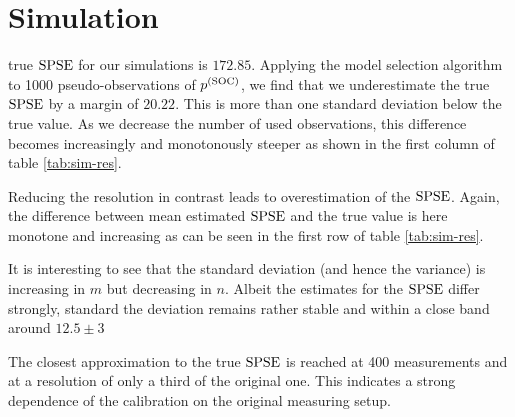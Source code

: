 \section{Simulation}
\label{sec:simulation}
	
	true $\mathrm{SPSE}$ for our simulations is $172.85$. Applying the model selection algorithm to 1000 pseudo-observations of $p^{(\mathrm{SOC})}$, we find that we underestimate the true $\mathrm{SPSE}$ by a margin of $20.22$. 
	This is more than one standard deviation below the true value.
	As we decrease the number of used observations, this difference becomes increasingly and monotonously steeper as shown in the first column of table \ref{tab:sim-res}.
		
	
	
	Reducing the resolution in contrast leads to overestimation of the $\mathrm{SPSE}$.
	Again, the difference between mean estimated $\mathrm{SPSE}$ and the true value is here monotone and increasing as can be seen in the first row of table \ref{tab:sim-res}.
	
	It is interesting to see that the standard deviation (and hence the variance) is increasing in $m$ but decreasing in $n$.
	Albeit the estimates for the $\mathrm{SPSE}$ differ strongly, standard the deviation remains rather stable and within a close band around $12.5 \pm 3$
	
	The closest approximation to the true $\mathrm{SPSE}$ is reached at 400 measurements and at a resolution of only a third of the original one.
	This indicates a strong dependence of the calibration on the original measuring setup.

